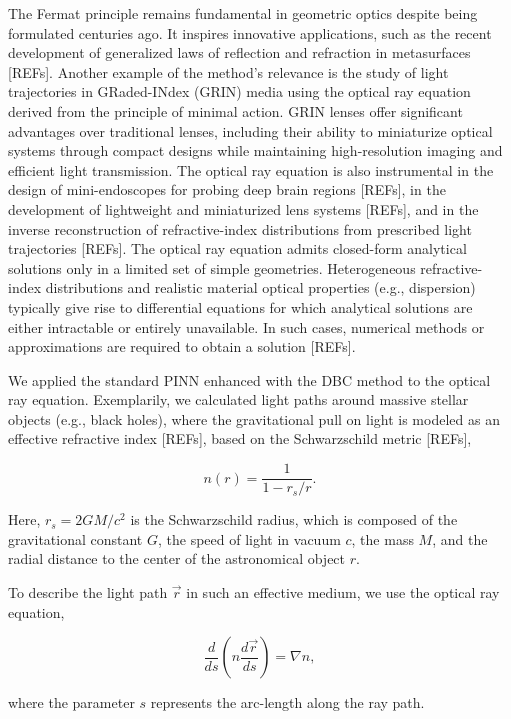 The Fermat principle remains fundamental in geometric optics despite being formulated centuries ago. It inspires innovative applications, such as the recent development of generalized laws of reflection and refraction in metasurfaces [REFs]. Another example of the method's relevance is the study of light trajectories in GRaded-INdex (GRIN) media using the optical ray equation derived from the principle of minimal action. GRIN lenses offer significant advantages over traditional lenses, including their ability to miniaturize optical systems through compact designs while maintaining high-resolution imaging and efficient light transmission. The optical ray equation is also instrumental in the design of mini-endoscopes for probing deep brain regions [REFs], in the development of lightweight and miniaturized lens systems [REFs], and in the inverse reconstruction of refractive-index distributions from prescribed light trajectories [REFs]. The optical ray equation admits closed-form analytical solutions only in a limited set of simple geometries. Heterogeneous refractive-index distributions and realistic material optical properties (e.g., dispersion) typically give rise to differential equations for which analytical solutions are either intractable or entirely unavailable. In such cases, numerical methods or approximations are required to obtain a solution [REFs].

We applied the standard PINN enhanced with the DBC method to the optical ray equation. Exemplarily, we calculated light paths around massive stellar objects (e.g., black holes), where the gravitational pull on light is modeled as an effective refractive index [REFs], based on the Schwarzschild metric [REFs],

\begin{equation}\label{eq:dbc_12}
n(r)=\frac{1}{1-r_s/r}.
\end{equation}

Here, $r_s=2GM/c^2$ is the Schwarzschild radius, which is composed of the gravitational constant $G$, the speed of light in vacuum $c$, the mass $M$, and the radial distance to the center of the astronomical object $r$.

To describe the light path $\vec{r}$ in such an effective medium, we use the optical ray equation,

\begin{equation}\label{eq:dbc_13}
\frac{d}{ds}\left(n\frac{d\vec{r}}{ds}\right)=\nabla n,
\end{equation}

where the parameter $s$ represents the arc-length along the ray path.

